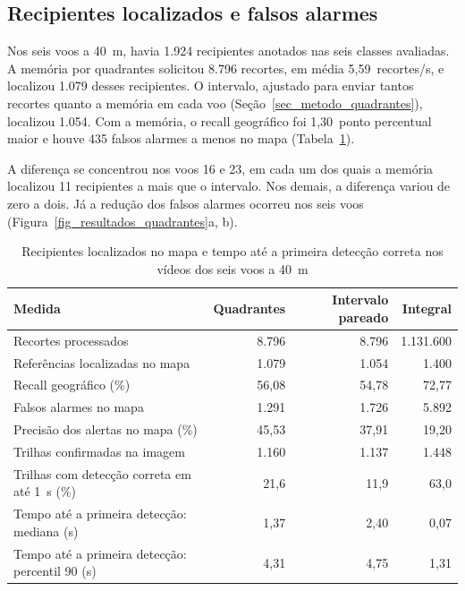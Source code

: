 \subsection{Recipientes localizados e falsos alarmes}
\label{sec_resultados_quadrantes}

Nos seis voos a 40~m, havia 1.924 recipientes anotados nas seis classes avaliadas. A memória por quadrantes solicitou 8.796 recortes, em média 5,59~recortes/s, e localizou 1.079 desses recipientes. O intervalo, ajustado para enviar tantos recortes quanto a memória em cada voo (Seção~\ref{sec_metodo_quadrantes}), localizou 1.054. Com a memória, o recall geográfico foi 1,30~ponto percentual maior e houve 435 falsos alarmes a menos no mapa (Tabela~\ref{tab_resultados_quadrantes}).

A diferença se concentrou nos voos 16 e 23, em cada um dos quais a memória localizou 11 recipientes a mais que o intervalo. Nos demais, a diferença variou de zero a dois. Já a redução dos falsos alarmes ocorreu nos seis voos (Figura~\ref{fig_resultados_quadrantes}a, b).

\begin{table}[!htbp]
  \centering
  \caption{Recipientes localizados no mapa e tempo até a primeira detecção correta nos vídeos dos seis voos a 40~m}
  \label{tab_resultados_quadrantes}
  \small
  \setlength{\tabcolsep}{5pt}
  \begin{tabular}{@{}lrrr@{}}
    \hline
    Medida & Quadrantes & Intervalo pareado & Integral \\
    \hline
    Recortes processados & 8.796 & 8.796 & 1.131.600 \\
    Referências localizadas no mapa & 1.079 & 1.054 & 1.400 \\
    Recall geográfico (\%) & 56,08 & 54,78 & 72,77 \\
    Falsos alarmes no mapa & 1.291 & 1.726 & 5.892 \\
    Precisão dos alertas no mapa (\%) & 45,53 & 37,91 & 19,20 \\
    \hline
    Trilhas confirmadas na imagem & 1.160 & 1.137 & 1.448 \\
    Trilhas com detecção correta em até 1~s (\%) & 21,6 & 11,9 & 63,0 \\
    Tempo até a primeira detecção: mediana (s) & 1,37 & 2,40 & 0,07 \\
    Tempo até a primeira detecção: percentil 90 (s) & 4,31 & 4,75 & 1,31 \\
    \hline
  \end{tabular}
\end{table}

